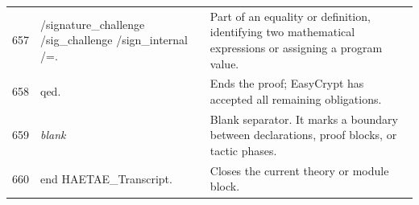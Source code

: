 \documentclass[10pt]{article}
\begin{document}
\begin{longtable}{r L{0.53\textwidth} L{0.37\textwidth}}
657 & {\ttfamily\scriptsize            /signature\_challenge /sig\_challenge /sign\_internal /=.} & Part of an equality or definition, identifying two mathematical expressions or assigning a program value. \\
658 & {\ttfamily\scriptsize qed.} & Ends the proof; EasyCrypt has accepted all remaining obligations. \\
659 & {\ttfamily\scriptsize \emph{blank}} & Blank separator.  It marks a boundary between declarations, proof blocks, or tactic phases. \\
660 & {\ttfamily\scriptsize end HAETAE\_Transcript.} & Closes the current theory or module block. \\
\bottomrule
\end{longtable}
\end{document}
